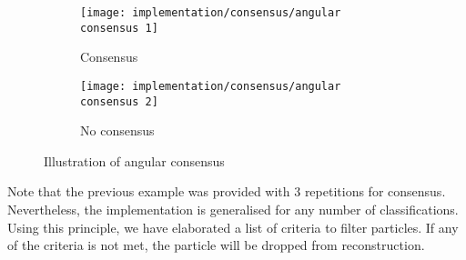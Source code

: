 \documentclass[../main.tex]{subfiles}
\begin{document}
\begin{figure}[htbp]
    \centering
    \begin{subfigure}[b]{0.45\textwidth}
         \centering
         \texttt{[image: implementation/consensus/angular consensus 1]}
         \caption{Consensus}
    \end{subfigure}
    \hfill
    \begin{subfigure}[b]{0.45\textwidth}
         \centering
         \texttt{[image: implementation/consensus/angular consensus 2]}
         \caption{No consensus}
    \end{subfigure}
    \caption{Illustration of angular consensus}
    \label{fig:4:angular_consensus_example}
\end{figure}

Note that the previous example was provided with 3 repetitions for consensus. Nevertheless, the implementation is generalised for any number of classifications. Using this principle, we have elaborated a list of criteria to filter particles. If any of the criteria is not met, the particle will be dropped from reconstruction.
\end{document}
